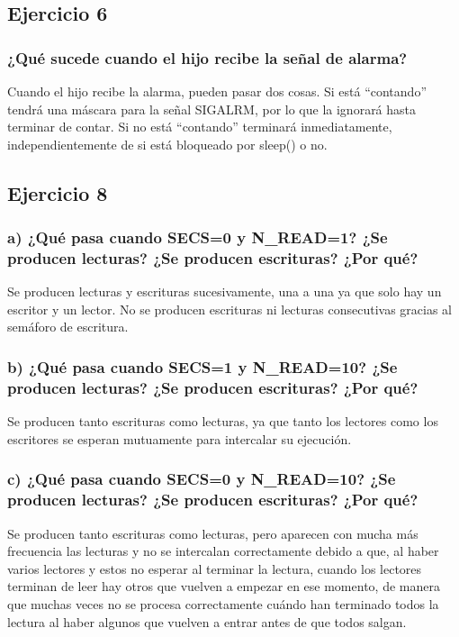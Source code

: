 \documentclass[]{article}
\begin{document}
\subsection*{Ejercicio 6}
\subsubsection*{¿Qué sucede cuando el hijo recibe la señal de alarma?}
Cuando el hijo recibe la alarma, pueden pasar dos cosas. Si está ``contando'' tendrá una máscara para la señal SIGALRM, por lo que la ignorará hasta terminar de contar. Si no está ``contando'' terminará inmediatamente, independientemente de si está bloqueado por sleep() o no.

\subsection*{Ejercicio 8}
\subsubsection*{a) ¿Qué pasa cuando SECS=0 y N\_READ=1? ¿Se producen lecturas? ¿Se producen escrituras? ¿Por qué?}
Se producen lecturas y escrituras sucesivamente, una a una ya que solo hay un escritor y un lector. No se producen escrituras ni lecturas consecutivas gracias al semáforo de escritura.

\subsubsection*{b) ¿Qué pasa cuando SECS=1 y N\_READ=10? ¿Se producen lecturas? ¿Se producen escrituras? ¿Por qué?}
Se producen tanto escrituras como lecturas, ya que tanto los lectores como los escritores se esperan mutuamente para intercalar su ejecución.

\subsubsection*{c) ¿Qué pasa cuando SECS=0 y N\_READ=10? ¿Se producen lecturas? ¿Se producen escrituras? ¿Por qué?}
Se producen tanto escrituras como lecturas, pero aparecen con mucha más frecuencia las lecturas y no se intercalan correctamente debido a que, al haber varios lectores y estos no esperar al terminar la lectura, cuando los lectores terminan de leer hay otros que vuelven a empezar en ese momento, de manera que muchas veces no se procesa correctamente cuándo han terminado todos la lectura al haber algunos que vuelven a entrar antes de que todos salgan. 
\end{document}

